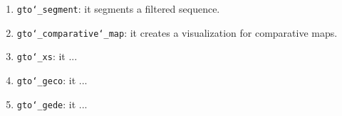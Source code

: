 \begin{enumerate}
\item \texttt{gto\char`_segment}: it segments a filtered sequence.

\item \texttt{gto\char`_comparative\char`_map}: it creates a visualization for comparative maps.

\item \texttt{gto\char`_xs}: it ...

\item \texttt{gto\char`_geco}: it ...

\item \texttt{gto\char`_gede}: it ...

\end{enumerate}


















